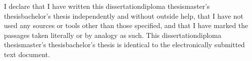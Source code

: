 \cleartoleftpageNotMainSec
{}
I declare that I have written this {\ifcase\type dissertation\or diploma thesis\or master's thesis\or bachelor's thesis\fi} independently and without outside help, that I have not used any sources or tools other than those specified, and that I have marked the passages taken literally or by analogy as such.
This {\ifcase\type dissertation\or diploma thesis\or master's thesis\or bachelor's thesis\fi} is identical to the electronically submitted text document.
